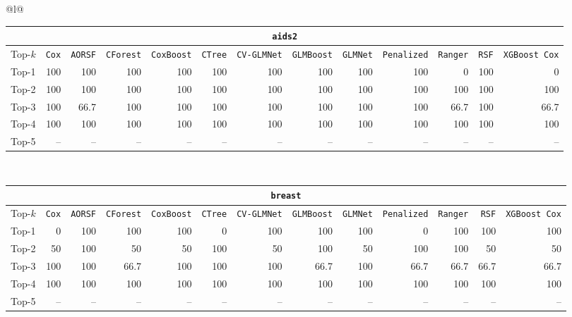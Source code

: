 \begin{longtable}{@{}l@{}}
\begin{tabular}{@{}l*{12}{r}@{}}
\multicolumn{13}{c}{\texttt{aids2}} \\
\midrule
Top-$k$ & \texttt{Cox} & \texttt{AORSF} & \texttt{CForest} & \texttt{CoxBoost} & \texttt{CTree} & \texttt{CV-GLMNet} & \texttt{GLMBoost} & \texttt{GLMNet} & \texttt{Penalized} & \texttt{Ranger} & \texttt{RSF} & \texttt{XGBoost Cox} \\
\midrule
Top-1 & 100 & 100 & 100 & 100 & 100 & 100 & 100 & 100 & 100 & 0 & 100 & 0 \\
Top-2 & 100 & 100 & 100 & 100 & 100 & 100 & 100 & 100 & 100 & 100 & 100 & 100 \\
Top-3 & 100 & 66.7 & 100 & 100 & 100 & 100 & 100 & 100 & 100 & 66.7 & 100 & 66.7 \\
Top-4 & 100 & 100 & 100 & 100 & 100 & 100 & 100 & 100 & 100 & 100 & 100 & 100 \\
Top-5 & -- & -- & -- & -- & -- & -- & -- & -- & -- & -- & -- & -- \\
\end{tabular} \\
\midrule

\begin{tabular}{@{}l*{12}{r}@{}}
\multicolumn{13}{c}{\texttt{breast}} \\
\midrule
Top-$k$ & \texttt{Cox} & \texttt{AORSF} & \texttt{CForest} & \texttt{CoxBoost} & \texttt{CTree} & \texttt{CV-GLMNet} & \texttt{GLMBoost} & \texttt{GLMNet} & \texttt{Penalized} & \texttt{Ranger} & \texttt{RSF} & \texttt{XGBoost Cox} \\
\midrule
Top-1 & 0 & 100 & 100 & 100 & 0 & 100 & 100 & 100 & 0 & 100 & 100 & 100 \\
Top-2 & 50 & 100 & 50 & 50 & 100 & 50 & 100 & 50 & 100 & 100 & 50 & 50 \\
Top-3 & 100 & 100 & 66.7 & 100 & 100 & 100 & 66.7 & 100 & 66.7 & 66.7 & 66.7 & 66.7 \\
Top-4 & 100 & 100 & 100 & 100 & 100 & 100 & 100 & 100 & 100 & 100 & 100 & 100 \\
Top-5 & -- & -- & -- & -- & -- & -- & -- & -- & -- & -- & -- & -- \\
\end{tabular} \\
\midrule


\end{longtable}
